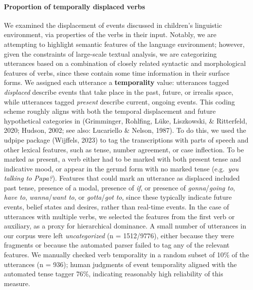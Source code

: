 \documentclass[
  man]{apa6}
\let\oldparagraph\paragraph
\renewcommand{\paragraph}[1]{\oldparagraph{#1}\mbox{}}
\begin{document}
\hypertarget{proportion-of-temporally-displaced-verbs}{%
\paragraph{Proportion of temporally displaced verbs}\label{proportion-of-temporally-displaced-verbs}}

We examined the displacement of events discussed in children's linguistic environment, via properties of the verbs in their input. Notably, we are attempting to highlight semantic features of the language environment; however, given the constraints of large-scale textual analysis, we are categorizing utterances based on a combination of closely related syntactic and morphological features of verbs, since these contain some time information in their surface forms. We assigned each utterance a \textbf{temporality} value: utterances tagged \emph{displaced} describe events that take place in the past, future, or irrealis space, while utterances tagged \emph{present} describe current, ongoing events. This coding scheme roughly aligns with both the temporal displacement and future hypothetical categories in (Grimminger, Rohlfing, Lüke, Liszkowski, \& Ritterfeld, 2020; Hudson, 2002; see also: Lucariello \& Nelson, 1987). To do this, we used the udpipe package (Wijffels, 2023) to tag the transcriptions with parts of speech and other lexical features, such as tense, number agreement, or case inflection. To be marked as present, a verb either had to be marked with both present tense and indicative mood, or appear in the gerund form with no marked tense (e.g.~\emph{you talking to Papa?}). Features that could mark an utterance as displaced included past tense, presence of a modal, presence of \emph{if}, or presence of \emph{gonna}/\emph{going to}, \emph{have to}, \emph{wanna}/\emph{want to}, or \emph{gotta}/\emph{got to}, since these typically indicate future events, belief states and desires, rather than real-time events. In the case of utterances with multiple verbs, we selected the features from the first verb or auxiliary, as a proxy for hierarchical dominance. A small number of utterances in our corpus were left \emph{uncategorized} (n = 1512/9776), either because they were fragments or because the automated parser failed to tag any of the relevant features. We manually checked verb temporality in a random subset of 10\% of the utterances (n = 936); human judgments of event temporality aligned with the automated tense tagger 76\%, indicating reasonably high reliability of this measure.
\end{document}
